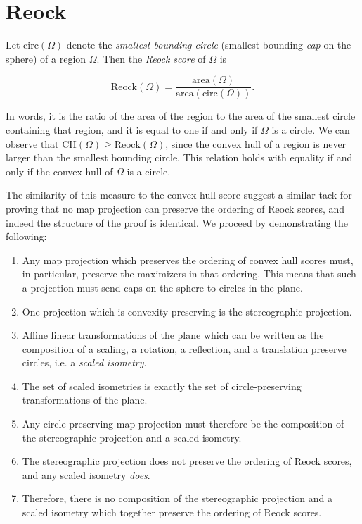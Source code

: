 \section{Reock}\label{sec:reock}

Let $\mathrm{circ}(\Omega)$ denote the \textit{smallest bounding circle} (smallest bounding \textit{cap} on the sphere) of a region $\Omega$.  Then the \textit{Reock score} of $\Omega$ is 

$$\mathrm{Reock}(\Omega)= \frac{\mathrm{area}(\Omega)}{\mathrm{area}(\mathrm{circ}(\Omega))}.$$

In words, it is the ratio of the area of the region to the area of the smallest circle containing that region, and it is equal to one if and only if $\Omega$ is a circle.  We can observe that $\mathrm{CH}(\Omega)\geq \mathrm{Reock}(\Omega)$, since the convex hull of a region is never larger than the smallest bounding circle.  This relation holds with equality if and only if the convex hull of $\Omega$ is a circle.  

The similarity of this measure to the convex hull score suggest a similar tack for proving that no map projection can preserve the ordering of Reock scores, and indeed the structure of the proof is identical.  We proceed by demonstrating the following:

\begin{enumerate}
    \item Any map projection which preserves the ordering of convex hull scores must, in particular, preserve the maximizers in that ordering.  This means that such a projection must send caps on the sphere to circles in the plane.
    \item One projection which is convexity-preserving is the stereographic projection.
    \item Affine linear transformations of the plane which can be written as the composition of a scaling, a rotation, a reflection, and a translation preserve circles, i.e. a \textit{scaled isometry}.
    \item The set of scaled isometries is exactly the set of circle-preserving transformations of the plane.
    \item Any circle-preserving map projection must therefore be the composition of the stereographic projection and a scaled isometry.
    \item The stereographic projection does not preserve the ordering of Reock scores, and any scaled isometry \textit{does}.
    \item Therefore, there is no composition of the stereographic projection and a scaled isometry which together preserve the ordering of Reock scores.
\end{enumerate}


